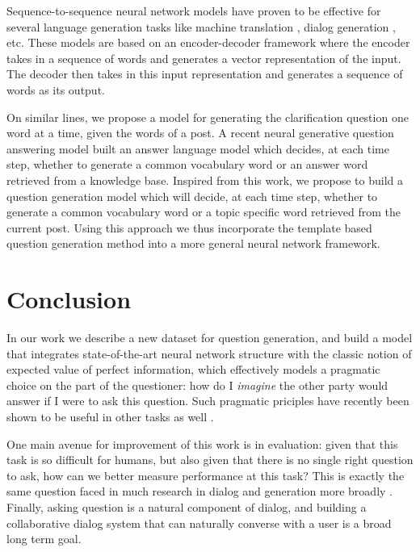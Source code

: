 \documentclass[11pt,a4paper]{article}
\begin{document}
Sequence-to-sequence neural network models have proven to be effective for several language generation tasks like machine translation \cite{sutskever2014sequence}, dialog generation \cite{serban2016building}, etc. These models are based on an encoder-decoder framework where the encoder takes in a sequence of words and generates a vector representation of the input. The decoder then takes in this input representation and generates a sequence of words as its output. 

On similar lines, we propose a model for generating the clarification question one word at a time, given the words of a post. A recent neural generative question answering model \cite{yin2015neural} built an answer language model which decides, at each time step, whether to generate a common vocabulary word or an answer word retrieved from a knowledge base. %
Inspired from this work, we propose to build a question generation model which will decide, at each time step, whether to generate a common vocabulary word or a topic specific word retrieved from the current post. Using this approach we thus incorporate the template based question generation method into a more general neural network framework.

\section{Conclusion}

In our work we describe a new dataset for question generation, and build a model that integrates state-of-the-art neural network structure with the classic notion of expected value of perfect information, which effectively models a pragmatic choice on the part of the questioner: how do I \emph{imagine} the other party would answer if I were to ask this question. Such pragmatic priciples have recently been shown to be useful in other tasks as well \cite{golland2010game,smith2013learning,orita2015discourse,andreas2016reasoning}.

One main avenue for improvement of this work is in evaluation: given that this task is so difficult for humans, but also given that there is no single right question to ask, how can we better measure performance at this task? This is exactly the same question faced in much research in dialog and generation more broadly \cite{paek2001empirical,lowe2015ubuntu,liu2016not,kannan2017adversarial}. Finally, asking question is a natural component of dialog, and building a collaborative dialog system that can naturally converse with a user is a broad long term goal.



\end{document}
